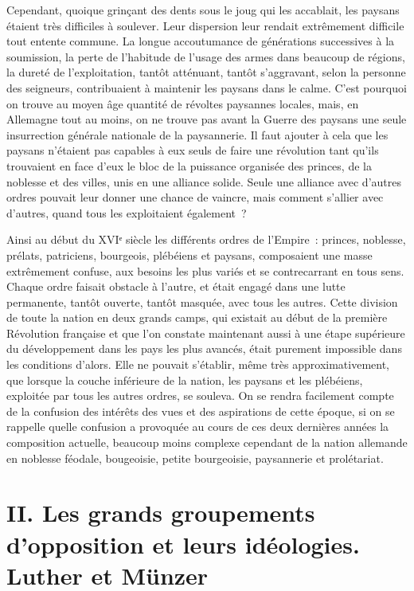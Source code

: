 \documentclass[french,twoside]{book} %
\newcommand\chapteropen{} %
\newcommand\chapterclose{} %
\begin{document}
Cependant, quoique grinçant des dents sous le joug qui les accablait, les paysans étaient très difficiles à soulever. Leur dispersion leur rendait extrêmement difficile tout entente commune. La longue accoutumance de générations successives à la soumission, la perte de l’habitude de l’usage des armes dans beaucoup de régions, la dureté de l’exploitation, tantôt atténuant, tantôt s’aggravant, selon la personne des seigneurs, contribuaient à maintenir les paysans dans le calme. C’est pourquoi on trouve au moyen âge quantité de révoltes paysannes locales, mais, en Allemagne tout au moins, on ne trouve pas avant la Guerre des paysans une seule insurrection générale nationale de la paysannerie. Il faut ajouter à cela que les paysans n’étaient pas capables à eux seuls de faire une révolution tant qu’ils trouvaient en face d’eux le bloc de la puissance organisée des princes, de la noblesse et des villes, unis en une alliance solide. Seule une alliance avec d’autres ordres pouvait leur donner une chance de vaincre, mais comment s’allier avec d’autres, quand tous les exploitaient également ?\par
Ainsi au début du XVIᵉ siècle les différents ordres de l’Empire : princes, noblesse, prélats, patriciens, bourgeois, plébéiens et paysans, composaient une masse extrêmement confuse, aux besoins les plus variés et se contrecarrant en tous sens. Chaque ordre faisait obstacle à l’autre, et était engagé dans une lutte permanente, tantôt ouverte, tantôt masquée, avec tous les autres. Cette division de toute la nation en deux grands camps, qui existait au début de la première Révolution française et que l’on constate maintenant aussi à une étape supérieure du développement dans les pays les plus avancés, était purement impossible dans les conditions d’alors. Elle ne pouvait s’établir, même très approximativement, que lorsque la couche inférieure de la nation, les paysans et les plébéiens, exploitée par tous les autres ordres, se souleva. On se rendra facilement compte de la confusion des intérêts des vues et des aspirations de cette époque, si on se rappelle quelle confusion a provoquée au cours de ces deux dernières années la composition actuelle, beaucoup moins complexe cependant de la nation allemande en noblesse féodale, bougeoisie, petite bourgeoisie, paysannerie et prolétariat.
\chapterclose


\chapteropen
\renewcommand{\leftmark}{II. Les grands groupements d’opposition et leurs idéologies. Luther et Münzer }
\chapter[II. Les grands groupements d’opposition et leurs idéologies. Luther et Münzer]{II. Les grands groupements d’opposition et leurs idéologies. Luther et Münzer }
\end{document}
